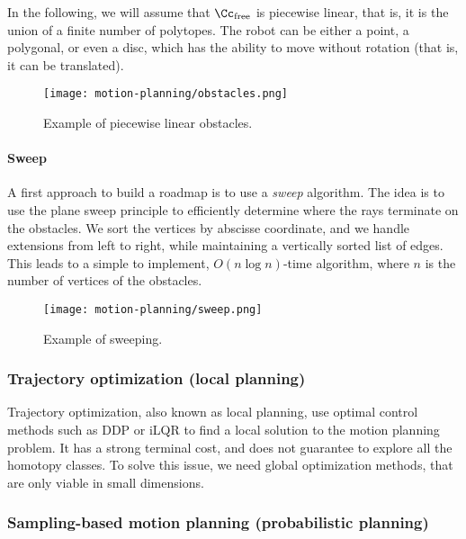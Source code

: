 In the following, we will assume that $\Cc_{\text{free}}$ is piecewise linear, that is, it is the union of a finite number of polytopes. The robot can be either a point, a polygonal, or even a disc, which has the ability to move without rotation (that is, it can be translated).
\begin{figure}[H]
    \centering
    \texttt{[image: motion-planning/obstacles.png]}
    \caption{Example of piecewise linear obstacles.}
\end{figure}

\paragraph*{Sweep}
A first approach to build a roadmap is to use a \emph{sweep} algorithm. The idea is to use the plane sweep principle to efficiently determine where the rays terminate on the obstacles. We sort the vertices by abscisse coordinate, and we handle extensions from left to right, while maintaining a vertically sorted list of edges. This leads to a simple to implement, $O(n\log n)$-time algorithm, where $n$ is the number of vertices of the obstacles.
\begin{figure}[H]
    \centering
    \texttt{[image: motion-planning/sweep.png]}
    \caption{Example of sweeping.}
\end{figure}

\subsubsection{Trajectory optimization (local planning)}
Trajectory optimization, also known as local planning, use optimal control methods such as DDP or iLQR to find a local solution to the motion planning problem. It has a strong terminal cost, and does not guarantee to explore all the homotopy classes. To solve this issue, we need global optimization methods, that are only viable in small dimensions. 

\subsubsection{Sampling-based motion planning (probabilistic planning)}


\newpage